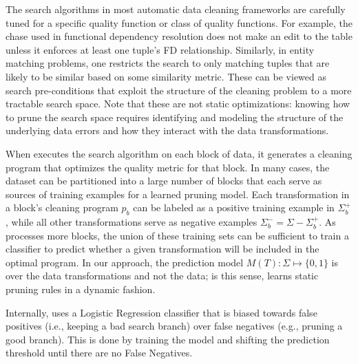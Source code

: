 The search algorithms in  most automatic data cleaning frameworks are carefully tuned for a specific quality function or class of quality functions. For example, the chase used in functional dependency resolution does not make an edit to the table unless it enforces at least one tuple's FD relationship.    Similarly, in entity matching problems, one restricts the search to only matching tuples that are likely to be similar based on some similarity metric.
These can be viewed as search pre-conditions that exploit the structure of the cleaning problem to a more tractable search space.
Note that these are not static optimizations: knowing how to prune the search space requires identifying and modeling the structure of the underlying data errors and how they interact with the data transformations.


When \sys executes the search algorithm on each block of data, it generates a cleaning program that optimizes the quality metric for that block.  In many cases, the dataset can be partitioned into a large number of blocks that each serve as sources of training examples for a learned pruning model.  Each transformation in a block's  cleaning program $p_b$ can be labeled as a positive training example in $\Sigma_b^+$, while all other transformations serve as negative examples $\Sigma_b^- = \Sigma - \Sigma_b^+$.
As \sys processes more blocks, the union of these training sets can be sufficient to train a classifier to predict whether a given transformation will be included in the optimal program.  In our approach, the prediction model $M(T): \Sigma \mapsto \{0,1\}$ is over the data transformations and not the data; is this sense, \sys learns static pruning rules in a dynamic fashion.    


Internally, \sys uses a Logistic Regression classifier that is biased towards false positives (i.e., keeping a bad search branch) over false negatives (e.g., pruning a good branch). This is done by training the model and shifting the prediction threshold until there are no False Negatives. 


